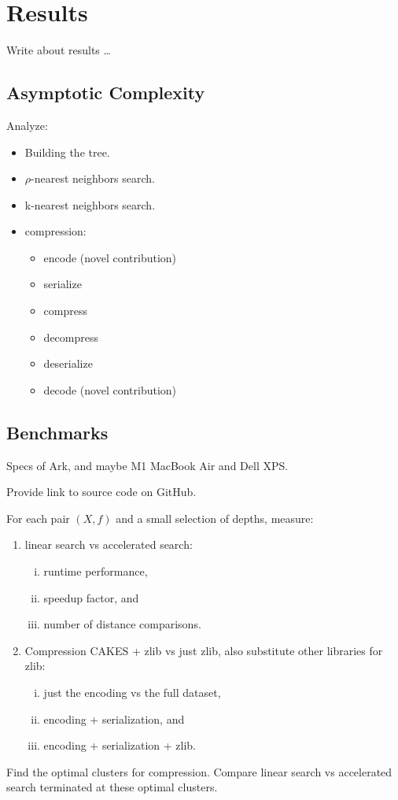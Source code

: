 \section{Results}
\label{sec:results}

Write about results \dots

\subsection{Asymptotic Complexity}
\label{subsec:results:asymptotic-complexity}

Analyze:
\begin{itemize}
    \item Building the tree.
    \item $\rho$-nearest neighbors search.
    \item k-nearest neighbors search.
    \item compression:
    \begin{itemize}
        \item encode (novel contribution)
        \item serialize
        \item compress
        \item decompress
        \item deserialize
        \item decode (novel contribution)
    \end{itemize}
\end{itemize}


\subsection{Benchmarks}
\label{subsec:results:benchmarks}

Specs of Ark, and maybe M1 MacBook Air and Dell XPS.

Provide link to source code on GitHub.

For each pair $(X, f)$ and a small selection of depths, measure:
\begin{enumerate}[1.]
    \item linear search vs accelerated search:
    \begin{enumerate}[i.]
        \item runtime performance,
        \item speedup factor, and
        \item number of distance comparisons.
    \end{enumerate}
    \item Compression CAKES + zlib vs just zlib, also substitute other libraries for zlib:
    \begin{enumerate}[i.]
        \item just the encoding vs the full dataset,
        \item encoding + serialization, and
        \item encoding + serialization + zlib.
    \end{enumerate}
\end{enumerate}

Find the optimal clusters for compression.
Compare linear search vs accelerated search terminated at these optimal clusters.
